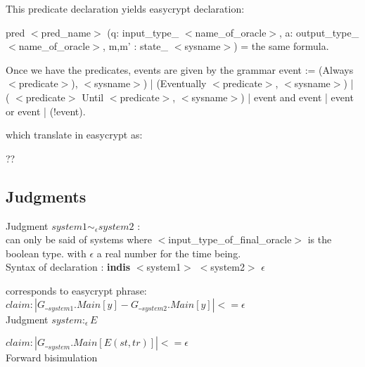 \documentclass[11pt]{article}
\renewcommand{\textit}[1]{ $<$#1$>$}
\begin{document}
This predicate declaration yields easycrypt declaration:

pred \textit{pred\_name} (q:  input\_type\_\textit{name\_of\_oracle},
a: output\_type\_\textit{name\_of\_oracle}, m,m' : state\_\textit{sysname}) =
the same formula.

Once we have the predicates, events are given by the
grammar
event := (Always \textit{predicate}),\textit{sysname}) | (Eventually \textit{predicate},\textit{sysname}) |
(\textit{predicate} Until \textit{predicate},\textit{sysname})  | event and  event | event or  event | (!event).

which translate in easycrypt as: 

??

\subsection{Judgments}
Judgment $system1 \sim_{\epsilon} system2$ :\\
 
can only be said of systems where \textit{input\_type\_of\_final\_oracle}
is the boolean type.
with $\epsilon$ a real number for the time being.\\

Syntax of declaration : 
\textbf{indis} \textit{system1}  \textit{system2} $\epsilon$

corresponds to easycrypt phrase:\\

$ claim : |G\__{system1}.Main[y] - G\__{system2}.Main[y] | <= \epsilon $\\





Judgment $system :_\epsilon E$

$ claim : |G\__{system}.Main[E(st,tr)]| <= \epsilon $\\

Forward bisimulation $ $
\end{document}
